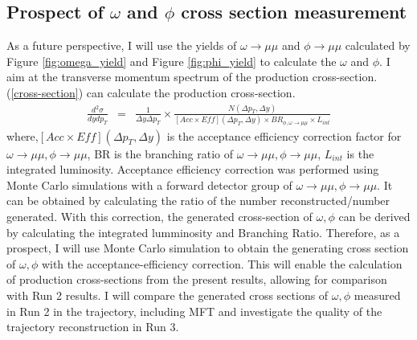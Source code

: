     \subsection{Prospect of $\omega$ and $\phi$ cross section measurement}
        As a future perspective, I will use the yields of $\omega \rightarrow\mu\mu$ and $\phi \rightarrow\mu\mu$ calculated by Figure \ref{fig:omega_yield} and Figure \ref{fig:phi_yield} to calculate the $\omega$ and $\phi$. I aim at the transverse momentum spectrum of the production cross-section.
        (\ref{cross-section}) can calculate the production cross-section\cite{phi-crosssection}.
        \begin{eqnarray}
            \frac{d^2\sigma}{dy dp_T} &=& \frac{1}{\Delta y \Delta p_T}\times \frac{N(\Delta p_T,\Delta y)}{[Acc\times Eff](\Delta p_T,\Delta y)\times BR_{\phi,\omega\rightarrow\mu\mu}\times L_{int}}
            \label{cross-section}
        \end{eqnarray}
        where,$[Acc \times Eff](\Delta p_T,\Delta y)$ is the acceptance efficiency correction factor for $\omega \rightarrow \mu\mu,\phi \rightarrow \mu\mu$, BR is the branching ratio of $\omega\rightarrow\mu\mu,\phi\rightarrow\mu\mu$, $L_{int}$ is the integrated luminosity.
        Acceptance efficiency correction was performed using Monte Carlo simulations with a forward detector group of $\omega\rightarrow\mu\mu,\phi\rightarrow\mu\mu$.
        It can be obtained by calculating the ratio of the number reconstructed/number generated. With this correction, the generated cross-section of $\omega,\phi$ can be derived by calculating the integrated lumminosity and Branching Ratio. Therefore, as a prospect, I will use Monte Carlo simulation to obtain the generating cross section of $\omega,\phi$ with the acceptance-efficiency correction.
        This will enable the calculation of production cross-sections from the present results, allowing for comparison with Run 2 results. I will compare the generated cross sections of $\omega,\phi$ measured in Run 2 in the trajectory, including MFT and investigate the quality of the trajectory reconstruction in Run 3.


